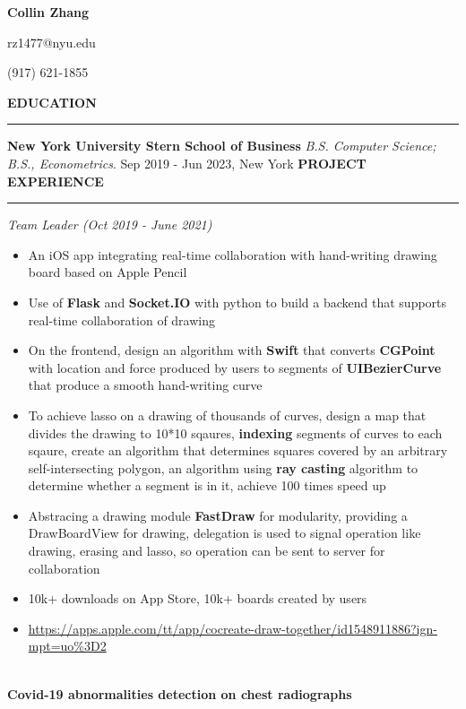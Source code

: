 \documentclass{article}
\begin{document}
\begin{center}
{\huge \textbf{Collin Zhang}}\par
rz1477@nyu.edu\par(917) 621-1855
\end{center}

\noindent
{\textbf{EDUCATION}}\newline
\rule{\textwidth}{1pt}
{\textbf {New York University Stern School of Business}}\newline
\emph {B.S. Computer Science; B.S., Econometrics}.\newline
{Sep 2019 - Jun 2023, New York}\newline
\newline
\noindent
{\textbf{PROJECT EXPERIENCE}}\newline
\rule{\textwidth}{1pt}\newline
\emph{Team Leader (Oct 2019 - June 2021)}
\begin{itemize}[leftmargin=*,topsep=0pt]
\item An iOS app integrating real-time collaboration with hand-writing drawing board based on Apple Pencil
\item Use of \textbf{Flask} and \textbf{Socket.IO} with python to build a backend that supports real-time collaboration of drawing
\item On the frontend, design an algorithm with \textbf{Swift} that converts \textbf{CGPoint} with location and force produced by users to segments of \textbf{UIBezierCurve} that produce a smooth hand-writing curve
\item To achieve lasso on a drawing of thousands of curves, design a map that divides the drawing to 10*10 sqaures, \textbf{indexing} segments of curves to each sqaure, create an algorithm that determines squares covered by an arbitrary self-intersecting polygon, an algorithm using \textbf{ray casting} algorithm to determine whether a segment is in it, achieve 100 times speed up
\item Abstracing a drawing module \textbf{FastDraw} for modularity, providing a DrawBoardView for drawing, delegation is used to signal operation like drawing, erasing and lasso, so operation can be sent to server for collaboration
\item 10k+ downloads on App Store, 10k+ boards created by users
\item \url{https://apps.apple.com/tt/app/cocreate-draw-together/id1548911886?ign-mpt=uo%3D2}

\end{itemize} \ \\ {\textbf{Covid-19 abnormalities detection on chest radiographs}}\newline
\end{document}
